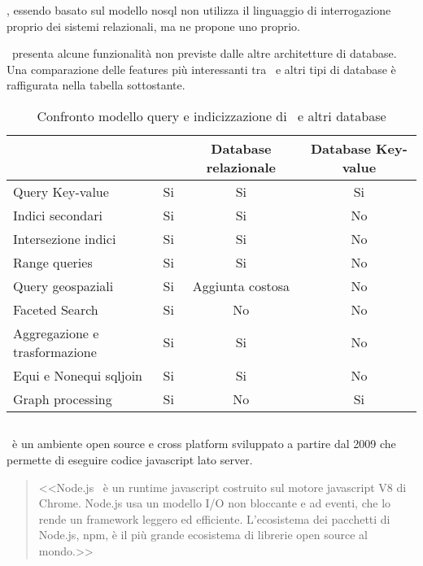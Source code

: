 \mongodb, essendo basato sul modello \acrshort{nosql} non utilizza il linguaggio di interrogazione proprio dei sistemi relazionali, ma ne propone uno proprio.

\mongodb~presenta alcune funzionalità non previste dalle altre architetture di database. Una comparazione delle features più interessanti tra \mongodb~e altri tipi di database è raffigurata nella tabella sottostante.
\begin{table}[!h]
	\caption{Confronto modello query e indicizzazione di \mongodb~e altri database\cite{mongodbarchitecture}}
	\centering
	\label{table:mongodbquerymodel}
	\begin{tabular}{c c c c}
		  & \mongodb & Database relazionale  & Database Key-value\\ 
		\midrule
		\multicolumn{1}{l}{Query Key-value} & Si & Si  & Si   \\
		\multicolumn{1}{l}{Indici secondari} & Si & Si  & No   \\
		\multicolumn{1}{l}{Intersezione indici} & Si & Si  & No   \\
		\multicolumn{1}{l}{Range queries} & Si & Si  & No   \\
		\multicolumn{1}{l}{Query geospaziali} & Si & Aggiunta costosa  & No   \\
		\multicolumn{1}{l}{Faceted Search} & Si & No  & No   \\
		\multicolumn{1}{l}{Aggregazione e trasformazione} & Si & Si  & No   \\
		\multicolumn{1}{l}{Equi e Nonequi \gls{sqljoin}} & Si & Si  & No   \\
		\multicolumn{1}{l}{Graph processing} & Si & No  & Si   \\
		\bottomrule
	\end{tabular}
\end{table}

\pagebreak

\subsection{\nodejs}
\nodejs~è un ambiente open source e cross platform sviluppato a partire dal 2009 che permette di eseguire codice \gls{javascript} lato server.
\begin{quote}
	<<Node.js\textregistered ~ è un runtime \gls{javascript} costruito sul motore \gls{javascript} V8 di Chrome. Node.js usa un modello I/O non bloccante e ad eventi, che lo rende un framework leggero ed efficiente. L'ecosistema dei pacchetti di Node.js, npm, è il più grande ecosistema di librerie open source al mondo.>> \cite{nodejs}
\end{quote}

